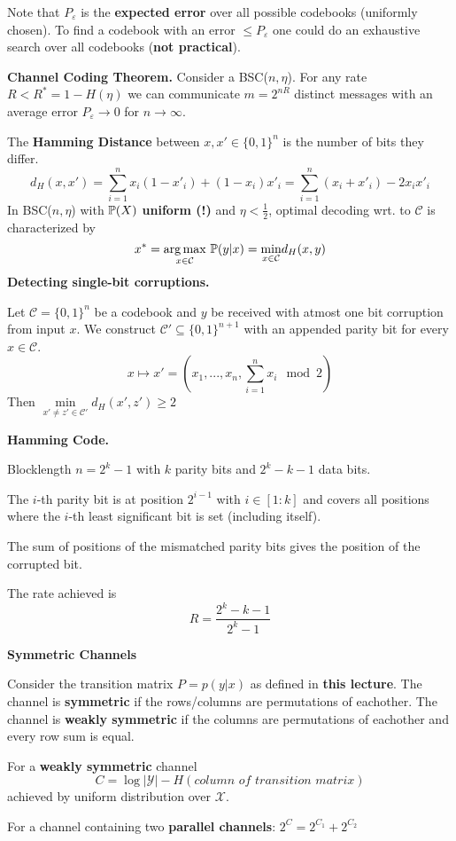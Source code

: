  Note that \(P_\varepsilon\) is the \textbf{expected error} over all possible codebooks (uniformly chosen). 
 To find a codebook with an error \(\leq P_\varepsilon\) one could do an exhaustive search over 
 all codebooks (\textbf{not practical}).

\vspace*{1mm}
 \textbf{Channel Coding Theorem.} Consider a BSC(\(n, \eta\)). For any rate \(R < R^* = 1- H(\eta)\) we can 
 communicate \(m = 2^{nR}\) distinct messages with an average error \(P_\varepsilon \to 0\) for \(n \to \infty\). 

 The \textbf{Hamming Distance} between \(x, x' \in \{0,1\}^n\) is the number of bits they differ.
 \[d_H(x, x') = \sum_{i = 1}^n x_i(1-x'_i)+(1-x_i)x'_i = \sum_{i = 1}^n (x_i + x'_i)-2x_ix'_i\]
In BSC(\(n, \eta\)) with \(\P(X)\) \textbf{uniform (!)} and \(\eta < \frac{1}{2}\), optimal 
decoding wrt. to \(\mathcal{C}\) is characterized by \[x^* = \underset{x \in \mathcal{C}}{\arg \max} \ \P(y|x) = \underset{x \in \mathcal{C}}{\min} d_H(x, y)\] 
\textbf{Detecting single-bit corruptions.}

Let \(\mathcal{C} = \{0, 1\}^n\) be a codebook and \(y\) be received with atmost one bit corruption from input \(x\).
We construct \(\mathcal{C}' \subseteq \{0,1\}^{n+1}\) with an appended parity bit for every \(x \in \mathcal{C}\).
\[x \mapsto x' = \left(x_1, ..., x_n, \sum_{i = 1}^n x_i \mod 2\right)\]
Then \(\underset{x'\neq z' \in \mathcal{C}'}{\min} d_H(x', z') \geq 2\)

\textbf{Hamming Code.}

Blocklength \(n = 2^k-1\) with \(k\) parity bits and \(2^k-k-1\) data bits. 

The \(i\)-th parity bit is at position \(2^{i-1}\) with \(i \in [1:k]\) and 
covers all positions where the \(i\)-th least significant bit is set (including itself).

The sum of positions of the mismatched parity bits gives the position of the corrupted bit.

The rate achieved is \[R = \frac{2^k-k-1}{2^k-1}\]

\textbf{Symmetric Channels}

Consider the transition matrix \(P = p(y|x)\) as defined in \textbf{this lecture}. The channel is 
\textbf{symmetric} if the rows/columns are permutations of eachother.
The channel is \textbf{weakly symmetric} if the columns are permutations of eachother and every row sum is equal.

For a \textbf{weakly symmetric} channel
\[C = \log |\mathcal{Y}| - H(\textit{column of transition matrix})\]
achieved by uniform distribution over \(\mathcal{X}\).

For a channel containing two \textbf{parallel channels}: \(2^C = 2^{C_1}+2^{C_2}\)